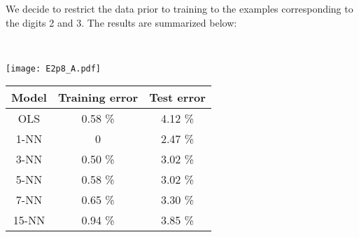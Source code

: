 

We decide to restrict the data prior to training to the examples corresponding to the digits 2 and 3. The results are summarized below:

\hspace{0.5cm}\\
\begin{minipage}{\half}
    \texttt{[image: E2p8\_A.pdf]}
\end{minipage}\halfspace
\begin{minipage}{\half}
    \centering
    \begin{tabular}{|c|c|c|}
        \hline
        \textbf{Model} & \textbf{Training error} & \textbf{Test error}\\
        \hline
        OLS & 0.58 \% & 4.12 \% \\
        \hline
        1-NN & 0 & 2.47 \% \\
        \hline
        3-NN & 0.50 \% & 3.02 \% \\
        \hline
        5-NN & 0.58 \% & 3.02 \% \\
        \hline
        7-NN & 0.65 \% & 3.30 \% \\
        \hline
        15-NN & 0.94 \% & 3.85 \% \\
        \hline
    \end{tabular}
\end{minipage}